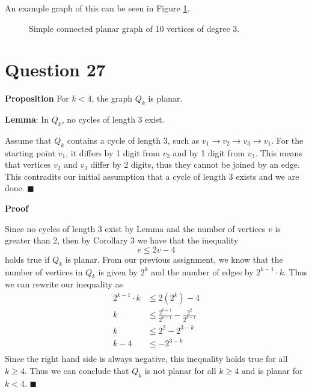 \documentclass[11pt, oneside]{article}   	%
\newcommand*{\QEDA}{\hfill\ensuremath{\blacksquare}}         %
\begin{document}
An example graph of this can be seen in Figure \ref{10v}.
\begin{figure}[h]
	\centering
        \caption{Simple connected planar graph of 10 vertices of degree 3.}
        \label{10v}
 \end{figure}

\section*{Question 27}

\textbf{Proposition} For $k <4$, the graph $Q_k$ is planar.

\textbf{Lemma}: In $Q_k$, no cycles of length 3 exist.

Assume that $Q_k$ contains a cycle of length 3, such as $v_1 \rightarrow v_2 \rightarrow v_3 \rightarrow v_1$. For the starting point $v_1$, it differs by 1 digit from $v_2$ and by 1 digit from $v_3$. This means that vertices $v_2$ and $v_3$ differ by 2 digits, thus they cannot be joined by an edge. This contradits our initial assumption that a cycle of length 3 exists and we are done. \QEDA

\textbf{Proof}

Since no cycles of length 3 exist by Lemma and the number of vertices $v$ is greater than 2, then by Corollary 3 we have that the inequality
$$e \leq 2v-4$$
holds true if $Q_k$ is planar. From our previous assignment, we know that the number of vertices in $Q_k$ is given by $2^k$ and the number of edges by $2^{k-1}\cdot k$. Thus we can rewrite our inequality as
\begin{align*}
	2^{k-1} \cdot k & \leq 2 (2^k)-4 \\	
	k & \leq \frac{2^{k+1}}{2^{k-1}}-\frac{2^2}{2^{k-1}}\\
	k & \leq 2^2 - 2^{3-k} \\
	k-4 & \leq -2^{3-k} \\
\end{align*}
Since the right hand side is always negative, this inequality holds true for all $k \geq 4$. Thus we can conclude that $Q_k$ is not planar for all $k \geq 4$ and is planar for $k<4$. \QEDA
\end{document}
